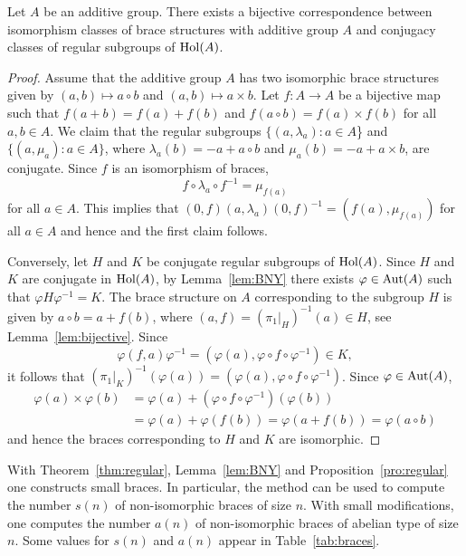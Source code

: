 \begin{proposition}
\label{pro:regular}
	Let $A$ be an additive group.  There exists a bijective correspondence between
	isomorphism classes of 
	brace structures with additive group $A$ and conjugacy classes of regular subgroups of
	$\operatorname{Hol}(A)$. 

	\begin{proof}
        Assume that the additive group $A$ has two isomorphic brace structures given by
		$(a,b)\mapsto a\circ b$ and $(a,b)\mapsto a\times b$. Let 
		$f\colon A\to A$ be a bijective map such that $f(a+b)=f(a)+f(b)$ and $f(a\circ b)=f(a)\times f(b)$ for
		all $a,b\in A$. 
		We claim that the regular subgroups $\{(a,\lambda_a):a\in A$\} and
		$\{(a,\mu_a):a\in A\}$, where $\lambda_a(b)=-a+a\circ b$ and
		$\mu_a(b)=-a+a\times b$, are conjugate. 
		Since $f$ is an isomorphism of braces, 
		\[
		f\circ\lambda_a\circ f^{-1}=\mu_{f(a)}
		\]
		for all $a\in A$. This implies that $(0,f)(a,\lambda_a)(0,f)^{-1}=(f(a),\mu_{f(a)})$ 
		for all $a\in A$ and hence 
		and the first claim follows. 
		
		Conversely, let $H$ and $K$ be conjugate regular subgroups of $\operatorname{Hol}(A)$. Since $H$ and $K$ are conjugate in $\operatorname{Hol}(A)$, by 
		Lemma~\ref{lem:BNY} there exists $\varphi\in\operatorname{Aut}(A)$ such that $\varphi
		H\varphi^{-1}=K$. The brace structure on $A$ corresponding to the subgroup $H$ is given by 
		$a\circ b=a+f(b)$,
		where
		$(a,f)=(\pi_1|_H)^{-1}(a)\in H$, see Lemma~\ref{lem:bijective}. 
		Since 
        \[
        \varphi(f,a)\varphi^{-1}=(\varphi(a),\varphi\circ f\circ \varphi^{-1})\in K,
        \]
        it follows that 
        $(\pi_1|_K)^{-1}(\varphi(a))=(\varphi(a),\varphi\circ f\circ \varphi^{-1})$. Since $\varphi\in\operatorname{Aut}(A)$, 
        \begin{align*}
            \varphi(a)\times\varphi(b)&=\varphi(a)+(\varphi\circ f\circ\varphi^{-1})(\varphi(b))\\
            &=\varphi(a)+\varphi(f(b))=\varphi(a+f(b))=\varphi(a\circ b)
        \end{align*}
        and hence the braces corresponding to $H$ and $K$ are
		isomorphic.
	\end{proof}
\end{proposition}

With Theorem~\ref{thm:regular}, Lemma~\ref{lem:BNY} and
Proposition~\ref{pro:regular} one constructs small braces. In particular, the
method can be used to compute the number $s(n)$ of non-isomorphic braces of
size $n$. With small modifications, one computes the number $a(n)$ of
non-isomorphic braces of abelian type of size $n$. 
Some values for $s(n)$ and $a(n)$ appear in
Table~\ref{tab:braces}. 

